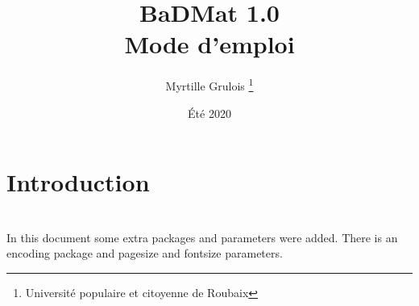 \documentclass[12pt, twoside]{article}
\title{BaDMat 1.0 \\ \large Mode d'emploi} %
\author{Myrtille Grulois \thanks{Université populaire et citoyenne de Roubaix}}
\date{Été 2020}
\begin{document}
\begin{titlepage}
\maketitle
\end{titlepage}

\tableofcontents
\clearpage

\section*{Introduction}


\section{}

In this document some extra packages and parameters
were added. There is an encoding package
and pagesize and fontsize parameters.
\end{document}
